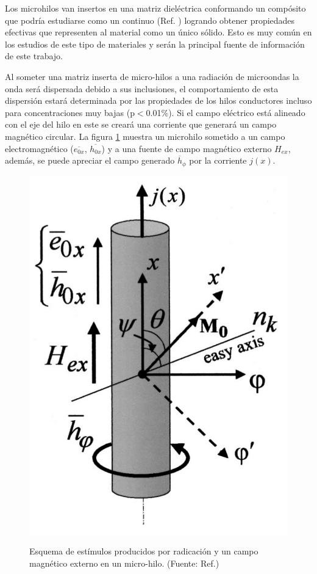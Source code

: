 \documentclass[12pt,letterpaper]{article}
\numberwithin{equation}{section}
\begin{document}
Los microhilos van insertos en una matriz dieléctrica conformando un compósito que podría estudiarse como un continuo (Ref. \cite{Wire_theory_1,Wire_theory_2}) logrando obtener propiedades efectivas que representen al material como un único sólido. Esto es muy común en los estudios de este tipo de materiales \cite{Wire_theory_1, Wire_theory_2,Wire_backgound,Wire_permeability} y serán la principal fuente de información de este trabajo.

Al someter una matriz inserta de micro-hilos a una radiación de microondas la onda será dispersada debido a sus inclusiones, el comportamiento de esta dispersión estará determinada por las propiedades de los hilos conductores incluso para concentraciones muy bajas (p$<$0.01\%). Si el campo eléctrico está alineado con el eje del hilo en este se creará una corriente que generará un campo magnético circular. La figura \ref{fig:Esquema_hilo} muestra un microhilo sometido a un campo electromagnético ($\overline{e_{0x}}$, $\overline{h_{0x}}$) y a una fuente de campo magnético externo $H_{ex}$, además, se puede apreciar el campo generado $\overline{h}_{\phi}$ por la corriente $j(x)$.
 
\begin{figure}[H]
	\centering\includegraphics[scale=0.3]{Imagenes/Esquema_hilo.png}\\
	\caption{Esquema de estímulos producidos por radicación y un campo magnético externo en un micro-hilo. (Fuente: Ref.\cite{Wire_theory_1})}
	\label{fig:Esquema_hilo}
\end{figure} 
\end{document}
